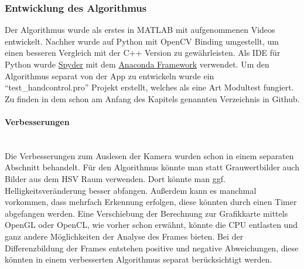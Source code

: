 \subsubsection{Entwicklung des Algorithmus}
Der Algorithmus wurde als erstes in MATLAB mit aufgenommenen Videos entwickelt. Nachher wurde auf Python mit OpenCV Binding umgestellt, um einen besseren Vergleich mit der C++ Version zu gewährleisten. Als IDE für Python wurde \href{https://github.com/spyder-ide/spyder}{Spyder} mit dem \href{https://www.continuum.io/downloads}{Anaconda Framework} verwendet. Um den Algorithmus separat von der App zu entwickeln wurde ein "`test\_handcontrol.pro"' Projekt erstellt, welches als eine Art Modultest fungiert. Zu finden in dem schon am Anfang des Kapitels genannten Verzeichnis in Github.

\paragraph{Verbesserungen}$\;$\\
Die Verbesserungen zum Auslesen der Kamera wurden schon in einem separaten Abschnitt behandelt. Für den Algorithmus könnte man statt Grauwertbilder auch Bilder aus dem HSV Raum verwenden. Dort könnte man ggf. Helligkeitsveränderung besser abfangen. Außerdem kann es manchmal vorkommen, dass mehrfach Erkennung erfolgen, diese könnten durch einen Timer abgefangen werden. Eine Verschiebung der Berechnung zur Grafikkarte mittels OpenGL oder OpenCL, wie vorher schon erwähnt, könnte die CPU entlasten und ganz andere Möglichkeiten der Analyse des Frames bieten. Bei der Differenzbildung der Frames entstehen positive und negative Abweichungen, diese könnten in einem verbesserten Algorithmus separat berücksichtigt werden.
